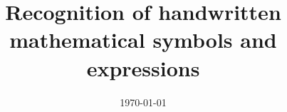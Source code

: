 \documentclass[a4paper, 11pt, oneside]{Thesis}  %
\begin{document}
\frontmatter      %
\title  {Recognition of handwritten mathematical symbols and expressions}
\addresses  {\groupname\\\deptname\\\univname}  %
\date       {\today}
\subject    {}
\keywords   {}

\maketitle



\fancyhead{}  %
\rhead{\thepage}  %
\lhead{}  %

\pagestyle{fancy}  %
\end{document}
